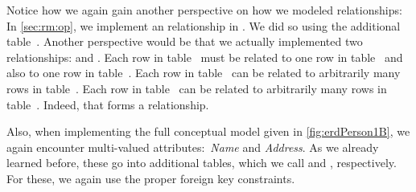 Notice how we again gain another perspective on how we modeled relationships:
In \cref{sec:rm:op}, we implement an  relationship in \sql.
We did so using the additional table~.
Another perspective would be that we actually implemented two relationships:
 and .
Each row in table~ must be related to one row in table~ and also to one row in table~.
Each row in table~ can be related to arbitrarily many rows in table~.
Each row in table~ can be related to arbitrarily many rows in table~.
Indeed, that forms a  relationship.

Also, when implementing the full conceptual model given in \cref{fig:erdPerson1B}, we again encounter multi-valued attributes:~\emph{Name} and \emph{Address}.
As we already learned before, these go into additional tables, which we call  and , respectively.
For these, we again use the proper foreign key  constraints.

